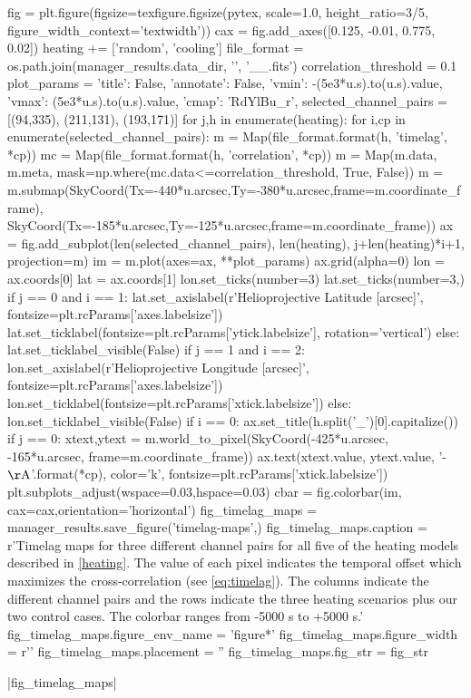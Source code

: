 \begin{pycode}
fig = plt.figure(figsize=texfigure.figsize(pytex, scale=1.0, height_ratio=3/5,
                                           figure_width_context='textwidth'))
cax = fig.add_axes([0.125, -0.01, 0.775, 0.02])
heating += ['random', 'cooling']
file_format = os.path.join(manager_results.data_dir, '{}', '{}_{}_{}.fits')
correlation_threshold = 0.1
plot_params = {'title': False, 'annotate': False, 'vmin': -(5e3*u.s).to(u.s).value,
               'vmax': (5e3*u.s).to(u.s).value, 'cmap': 'RdYlBu_r',}
selected_channel_pairs = [(94,335), (211,131), (193,171)]
for j,h in enumerate(heating):
    for i,cp in enumerate(selected_channel_pairs):
        m = Map(file_format.format(h, 'timelag', *cp))
        mc = Map(file_format.format(h, 'correlation', *cp))
        m = Map(m.data, m.meta, mask=np.where(mc.data<=correlation_threshold, True, False))
        m = m.submap(SkyCoord(Tx=-440*u.arcsec,Ty=-380*u.arcsec,frame=m.coordinate_frame),
                     SkyCoord(Tx=-185*u.arcsec,Ty=-125*u.arcsec,frame=m.coordinate_frame))
        ax = fig.add_subplot(len(selected_channel_pairs), len(heating), j+len(heating)*i+1,
                             projection=m)
        im = m.plot(axes=ax, **plot_params)
        ax.grid(alpha=0)
        lon = ax.coords[0]
        lat = ax.coords[1]
        lon.set_ticks(number=3)
        lat.set_ticks(number=3,) 
        if j == 0 and i == 1:
            lat.set_axislabel(r'Helioprojective Latitude [arcsec]', fontsize=plt.rcParams['axes.labelsize'])
            lat.set_ticklabel(fontsize=plt.rcParams['ytick.labelsize'], rotation='vertical')
        else:
            lat.set_ticklabel_visible(False)
        if j == 1 and i == 2:
            lon.set_axislabel(r'Helioprojective Longitude [arcsec]', fontsize=plt.rcParams['axes.labelsize'])
            lon.set_ticklabel(fontsize=plt.rcParams['xtick.labelsize'])
        else:
            lon.set_ticklabel_visible(False)
        if i == 0:
            ax.set_title(h.split('_')[0].capitalize())
        if j == 0:
            xtext,ytext = m.world_to_pixel(SkyCoord(-425*u.arcsec, -165*u.arcsec, frame=m.coordinate_frame))
            ax.text(xtext.value, ytext.value, '{}-{} $\mathrm{{\AA}}$'.format(*cp),
                    color='k', fontsize=plt.rcParams['xtick.labelsize'])
plt.subplots_adjust(wspace=0.03,hspace=0.03)
cbar = fig.colorbar(im, cax=cax,orientation='horizontal')
fig_timelag_maps = manager_results.save_figure('timelag-maps',)
fig_timelag_maps.caption = r'Timelag maps for three different channel pairs for all five of the heating models described in \autoref{heating}. The value of each pixel indicates the temporal offset which maximizes the cross-correlation (see \autoref{eq:timelag}). The columns indicate the different channel pairs and the rows indicate the three heating scenarios plus our two control cases. The colorbar ranges from -5000 s to +5000 s.'
fig_timelag_maps.figure_env_name = 'figure*'
fig_timelag_maps.figure_width = r'\textwidth'
fig_timelag_maps.placement = ''
fig_timelag_maps.fig_str = fig_str
\end{pycode}
|fig_timelag_maps|

